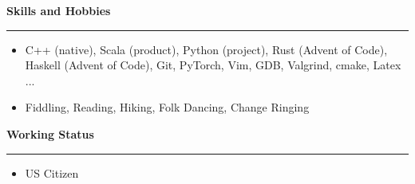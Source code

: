 \documentclass[10pt,A4]{article}
\newcommand{\cvsection}[1]
{
	\begin{flushleft}
  \LARGE\textcolor{sectcol}{\textbf{  #1}}
	\end{flushleft}
  \vspace{-15pt}
  \textcolor{softcol}{\hrule}
  \vspace{8pt}
}
\newcommand{\mystrut}{\rule[-.3\baselineskip]{0pt}{\baselineskip}}
\begin{document}
\cvsection{Skills and Hobbies}
\vspace{-10pt}
\begin{itemize}
 \setlength\itemsep{-0.1cm}
 \item C++ (native), Scala (product), Python (project), Rust (Advent of Code), Haskell (Advent of Code),  Git, PyTorch, Vim, GDB, Valgrind, cmake, Latex ...
 \item Fiddling, Reading, Hiking, Folk Dancing, Change Ringing
\end{itemize}

\cvsection{Working Status}
\vspace{-10pt}
\begin{itemize}
 \item US Citizen
\end{itemize}







%
%
%
%
%
%
\end{document}
